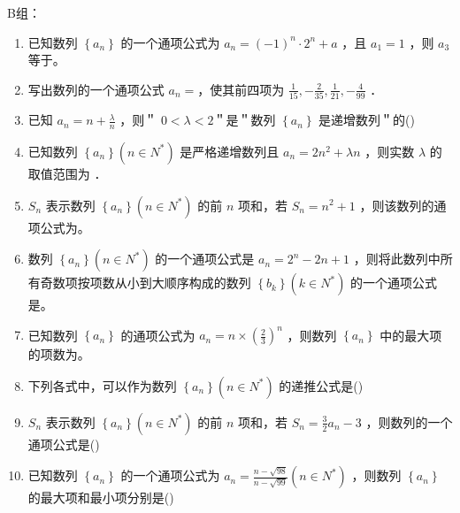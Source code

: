 B组：
\begin{enumerate}
    \item 已知数列 $\left\{a_n\right\}$ 的一个通项公式为 $a_n=(-1)^n \cdot 2^n+a$ ，且 $a_1=1$ ，则 $a_3$ 等于。

\item 写出数列的一个通项公式 $a_n=$，使其前四项为 $\frac{1}{15},-\frac{2}{35}, \frac{1}{21},-\frac{4}{99}$ ．

\item 已知 $a_n=n+\frac{\lambda}{n}$ ，则＂ $0<\lambda<2$＂是＂数列 $\left\{a_n\right\}$ 是递增数列＂的\dotfill{}()

\item 已知数列 $\left\{a_n\right\}\left(n \in N^*\right)$ 是严格递增数列且 $a_n=2 n^2+\lambda n$ ，则实数 $\lambda$ 的取值范围为 ．

\item $S_n$ 表示数列 $\left\{a_n\right\}\left(n \in N^*\right)$ 的前 $n$ 项和，若 $S_n=n^2+1$ ，则该数列的通项公式为。

\item 数列 $\left\{a_n\right\}\left(n \in N^*\right)$ 的一个通项公式是 $a_n=2^n-2 n+1$ ，则将此数列中所有奇数项按项数从小到大顺序构成的数列 $\left\{b_k\right\}\left(k \in N^*\right)$ 的一个通项公式是。

\item 已知数列 $\left\{a_n\right\}$ 的通项公式为 $a_n=n \times\left(\frac{2}{3}\right)^n$ ，则数列 $\left\{a_n\right\}$ 中的最大项的项数为。

\item 下列各式中，可以作为数列 $\left\{a_n\right\}\left(n \in N^*\right)$ 的递推公式是\dotfill{}()

\item $S_n$ 表示数列 $\left\{a_n\right\}\left(n \in N^*\right)$ 的前 $n$ 项和，若 $S_n=\frac{3}{2} a_n-3$ ，则数列的一个通项公式是\dotfill{}()


\item 已知数列 $\left\{a_n\right\}$ 的一个通项公式为 $a_n=\frac{n-\sqrt{98}}{n-\sqrt{99}}\left(n \in N^*\right)$ ，则数列 $\left\{a_n\right\}$ 的最大项和最小项分别是\dotfill{}()


\end{enumerate}
